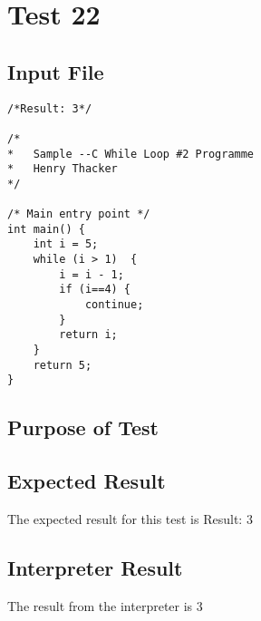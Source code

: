 \section{Test 22}
\subsection{Input File}
\begin{verbatim}
/*Result: 3*/

/*
*	Sample --C While Loop #2 Programme
*	Henry Thacker
*/

/* Main entry point */
int main() {
	int i = 5;
	while (i > 1)  {
		i = i - 1;
		if (i==4) {
			continue;
		}
		return i;
	}
	return 5;
}\end{verbatim}\subsection{Purpose of Test}

\subsection{Expected Result}
The expected result for this test is Result: 3
\subsection{Interpreter Result}
The result from the interpreter is 3
